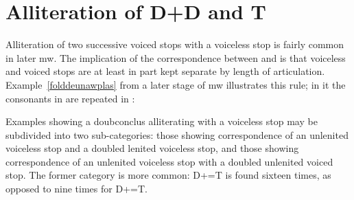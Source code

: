 \section{Alliteration of  \gls{D}+\gls{D} and \gls{T}}
\label{ddt}
Alliteration of two successive voiced stops with a voiceless stop is fairly common in later \gls{mw}. The implication of the correspondence between  and  is that voiceless and voiced stops are at least in part kept separate by length of articulation. Example~\ref{folddeunawplas} from a later stage of \gls{mw}  illustrates this rule; in it the consonants in  are repeated in :

Examples showing a \gls{doubconclus} alliterating with a voiceless stop may be subdivided into two sub-categories: those showing correspondence of an unlenited voiceless stop and a doubled lenited voiceless stop, and those showing correspondence of an unlenited voiceless stop with a doubled unlenited voiced stop. The former category is more common: \gls{D}+\lT=\gls{T} is found sixteen times, as opposed to nine times for \gls{D}+\xD=\gls{T}.

